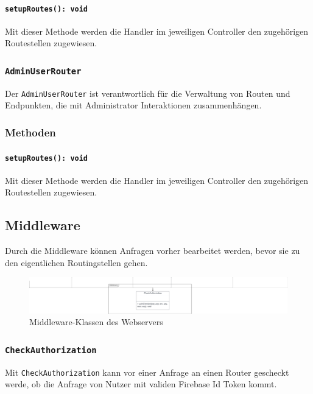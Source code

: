 \documentclass{entwurfsheft}
\begin{document}
\paragraph{\texttt{setupRoutes(): void}}
Mit dieser Methode werden die Handler im jeweiligen Controller den zugehörigen Routestellen zugewiesen.

\subsubsection{\texttt{AdminUserRouter}}\label{sec:AdminUserRouter}
Der \texttt{AdminUserRouter} ist verantwortlich für die Verwaltung von Routen und Endpunkten, die mit Administrator Interaktionen zusammenhängen.
\subsubsection*{Methoden}
\paragraph{\texttt{setupRoutes(): void}}
Mit dieser Methode werden die Handler im jeweiligen Controller den zugehörigen Routestellen zugewiesen.

\newpage

\subsection{Middleware}
Durch die Middleware können Anfragen vorher bearbeitet werden, bevor sie zu den eigentlichen Routingstellen gehen.

\begin{figure}[htp]
    \centering
    \includegraphics[width = 1\textwidth]{images/webserver/middleware.pdf}
    \caption{Middleware-Klassen des Webservers}
    \label{fig:middleware}
\end{figure}

\subsubsection{\texttt{CheckAuthorization}}\label{sec:CheckAuthorization}
Mit \texttt{CheckAuthorization} kann vor einer Anfrage an einen Router gescheckt werde, ob die Anfrage von Nutzer mit validen Firebase Id Token kommt. %
\end{document}
